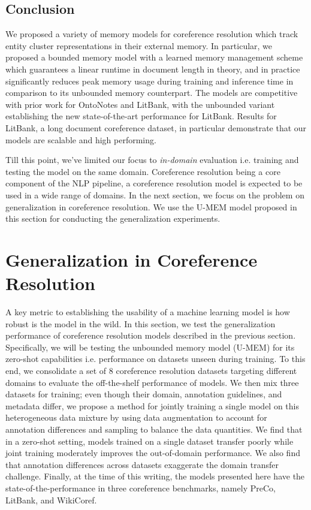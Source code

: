 \documentclass[12pt]{thesis-umich}[thesis]
\newcommand{\unbounded}{U-MEM\xspace}
\begin{document}
\subsection{Conclusion}
We proposed a variety of memory models for coreference resolution which track entity cluster representations in their external memory. 
In particular, we proposed a bounded memory model with a learned memory management scheme which guarantees a linear runtime in document length in theory, and  in practice significantly reduces peak memory usage during training and inference time in comparison to its unbounded memory counterpart. 
The models are competitive with prior work for OntoNotes and LitBank, with the unbounded variant establishing the new state-of-the-art performance for LitBank.
Results for LitBank, a long document coreference dataset, in particular demonstrate that our models are scalable and high performing.  

Till this point, we've limited our focus to \emph{in-domain} evaluation i.e. training and testing the model on the same domain. Coreference resolution being a core component of the NLP pipeline, a coreference resolution model is expected to be used in a wide range of domains. In the next section, we focus on the problem on generalization in coreference resolution. We use the \unbounded model proposed in this section for conducting the generalization experiments. 

 
\section{Generalization in Coreference Resolution}
\label{sec:generalization}
A key metric to establishing the usability of a machine learning model is how robust is the model in the wild. 
In this section, we test the generalization performance of coreference resolution models described in the previous section. Specifically, we will be testing the unbounded memory model (U-MEM) for its zero-shot capabilities i.e. performance on datasets unseen during training. 
To this end, we consolidate a set of 8 coreference resolution datasets targeting different domains to evaluate the off-the-shelf performance of models. 
We then mix three datasets for training; even though their domain, annotation guidelines, and metadata differ, we propose a method for jointly training a single model on this heterogeneous data mixture by using data augmentation to account for annotation differences and sampling to balance the data quantities. 
We find that in a zero-shot setting, models trained on a single dataset transfer poorly while joint training moderately improves the out-of-domain performance.  
We also find that annotation differences across datasets exaggerate the domain transfer challenge.  
Finally, at the time of this writing, the models presented here have the state-of-the-performance in three coreference benchmarks, namely PreCo, LitBank, and WikiCoref.   
\end{document}
